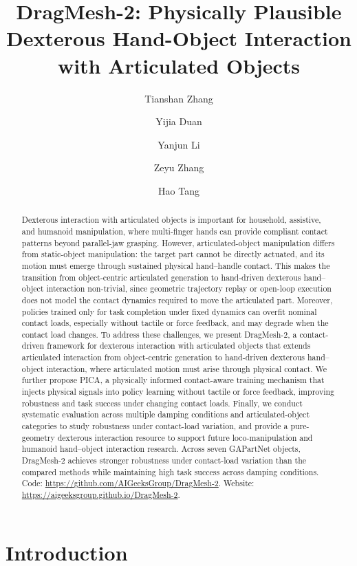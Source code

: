 \documentclass{llmxive}
\title{DragMesh-2: Physically Plausible Dexterous Hand-Object Interaction with Articulated Objects}
\author{Tianshan Zhang \and Yijia Duan \and Yanjun Li \and Zeyu Zhang \and Hao Tang}
\begin{document}
\maketitle
\begin{abstract}
Dexterous interaction with articulated objects is important for household, assistive, and humanoid manipulation, where multi-finger hands can provide compliant contact patterns beyond parallel-jaw grasping. However, articulated-object manipulation differs from static-object manipulation: the target part cannot be directly actuated, and its motion must emerge through sustained physical hand--handle contact. This makes the transition from object-centric articulated generation to hand-driven dexterous hand--object interaction non-trivial, since geometric trajectory replay or open-loop execution does not model the contact dynamics required to move the articulated part. Moreover, policies trained only for task completion under fixed dynamics can overfit nominal contact loads, especially without tactile or force feedback, and may degrade when the contact load changes. To address these challenges, we present DragMesh-2, a contact-driven framework for dexterous interaction with articulated objects that extends articulated interaction from object-centric generation to hand-driven dexterous hand--object interaction, where articulated motion must arise through physical contact. We further propose PICA, a physically informed contact-aware training mechanism that injects physical signals into policy learning without tactile or force feedback, improving robustness and task success under changing contact loads. Finally, we conduct systematic evaluation across multiple damping conditions and articulated-object categories to study robustness under contact-load variation, and provide a pure-geometry dexterous interaction resource to support future loco-manipulation and humanoid hand--object interaction research. Across seven GAPartNet objects, DragMesh-2 achieves stronger robustness under contact-load variation than the compared methods while maintaining high task success across damping conditions.
Code: \url{https://github.com/AIGeeksGroup/DragMesh-2}.
Website: \url{https://aigeeksgroup.github.io/DragMesh-2}.
\end{abstract}
\section{Introduction}
\end{document}
